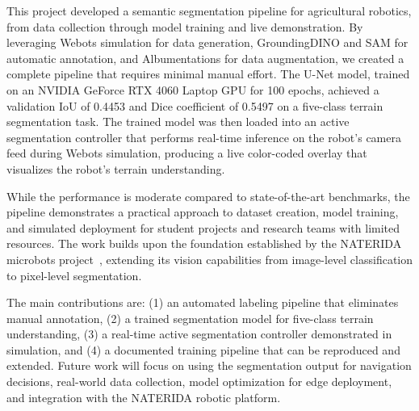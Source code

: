\documentclass[12pt,a4paper]{article}
\begin{document}
This project developed a semantic segmentation pipeline for agricultural robotics, from data collection through model training and live demonstration. By leveraging Webots simulation for data generation, GroundingDINO and SAM for automatic annotation, and Albumentations for data augmentation, we created a complete pipeline that requires minimal manual effort. The U-Net model, trained on an NVIDIA GeForce RTX 4060 Laptop GPU for 100 epochs, achieved a validation IoU of 0.4453 and Dice coefficient of 0.5497 on a five-class terrain segmentation task. The trained model was then loaded into an active segmentation controller that performs real-time inference on the robot's camera feed during Webots simulation, producing a live color-coded overlay that visualizes the robot's terrain understanding.

While the performance is moderate compared to state-of-the-art benchmarks, the pipeline demonstrates a practical approach to dataset creation, model training, and simulated deployment for student projects and research teams with limited resources. The work builds upon the foundation established by the NATERIDA microbots project~\cite{naterida}, extending its vision capabilities from image-level classification to pixel-level segmentation.

The main contributions are: (1) an automated labeling pipeline that eliminates manual annotation, (2) a trained segmentation model for five-class terrain understanding, (3) a real-time active segmentation controller demonstrated in simulation, and (4) a documented training pipeline that can be reproduced and extended. Future work will focus on using the segmentation output for navigation decisions, real-world data collection, model optimization for edge deployment, and integration with the NATERIDA robotic platform.
\end{document}
